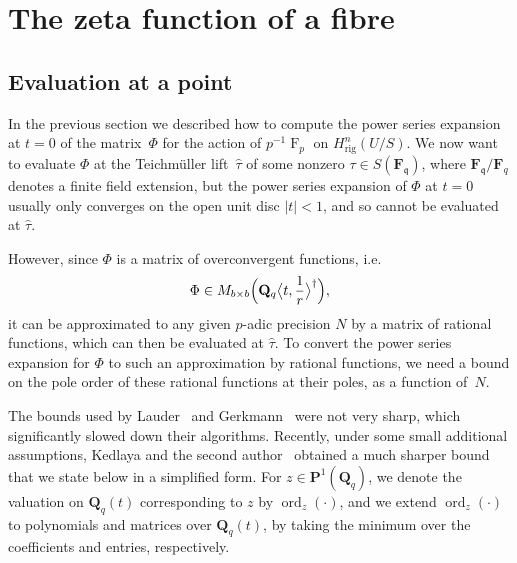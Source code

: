 \documentclass[a4paper,11pt]{article}
\numberwithin{equation}{section}
\providecommand{\abs}[1]{\lvert#1\rvert}                 %
\newcommand{\QQ}{\mathbf{Q}} %
\newcommand{\FF}{\mathbf{F}} %
\DeclareMathOperator{\ord}{ord}          %
\DeclareMathOperator{\Frob}{F}           %
\providecommand{\Hrig}{H_{\text{rig}}}  %
\theoremstyle{definition}
\begin{document}

\section{The zeta function of a fibre}

\label{sec:ZetaFunctions}

\subsection{Evaluation at a point}

In the previous section we described how to compute the power series 
expansion at $t=0$ of the matrix~$\Phi$ for the action of $p^{-1} \Frob_p$ on 
$\Hrig^{n}(U/S)$. We now want to evaluate $\Phi$ at the Teichm\"uller 
lift~$\hat{\tau}$ of some nonzero $\tau \in S(\FF_{\mathfrak{q}})$, 
where $\FF_{\mathfrak{q}}/\FF_q$ denotes a finite field extension, but 
the power series expansion of $\Phi$ 
at $t=0$ usually only converges on the open unit disc $\abs{t} < 1$, 
and so cannot be evaluated at $\hat{\tau}$. 

However, since $\Phi$ is a matrix of overconvergent functions, i.e.\ 
\[
\Phi \in M_{b \times b}\Bigl(\QQ_q \bigl\langle t,\frac{1}{r} \bigr\rangle^{\dag}\Bigr),
\]
it can be approximated to any given $p$-adic precision $N$ by a matrix 
of rational functions, which can then be evaluated at $\hat{\tau}$. To 
convert the power series expansion for $\Phi$ to such an approximation 
by rational functions, we need a bound on the pole order of these 
rational functions at their poles, as a function of~$N$.

The bounds used by Lauder~\citep[\S 8.1]{Lauder2004a} and 
Gerkmann~\citep[\S 6]{Gerkmann2007} were not very sharp, 
which significantly slowed down their algorithms.
Recently, under some small additional assumptions, Kedlaya and the second 
author~\citep[Theorem~2.1]{KedlayaTuitman2012} obtained a much sharper bound 
that we state below in a simplified form. For $z \in \mathbf{P}^1(\QQ_q)$, we
denote the valuation on $\QQ_q(t)$ corresponding to $z$ by $\ord_z(\cdot)$, and
we extend $\ord_z(\cdot)$ to polynomials and matrices over $\QQ_q(t)$, by
taking the minimum over the coefficients and entries, respectively.
\end{document}
